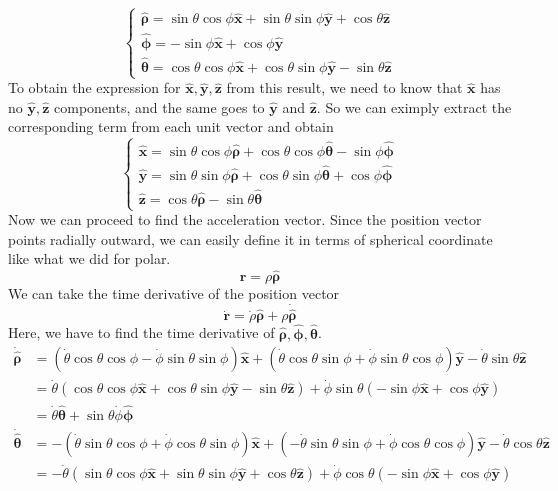 \documentclass[12pt]{article}
\newcommand{\paren}[1]{\left( #1 \right)}
\newcommand{\unx}{\hat{\mathbf{x}}}
\newcommand{\uny}{\hat{\mathbf{y}}}
\newcommand{\unz}{\hat{\mathbf{z}}}
\newcommand{\untheta}{\hat{\boldsymbol\theta}}
\newcommand{\unphi}{\hat{\boldsymbol\phi}}
\newcommand{\unrho}{\hat{\boldsymbol\rho}}
\begin{document}
\begin{enumerate}
\[\begin{cases}
        \unrho = \sin\theta\cos\phi \unx + \sin\theta\sin\phi\uny + \cos\theta \unz\\
        \unphi = -\sin\phi\unx + \cos\phi \uny\\
        \untheta = \cos\theta\cos\phi \unx + \cos\theta\sin\phi \uny - \sin\theta \unz
    \end{cases}
    \]
    To obtain the expression for $\unx, \uny, \unz$ from this result, we need to know that $\unx$ has no $\uny,\unz$ components, and the same goes to $\uny$ and $\unz$. So we can eximply extract the corresponding term from each unit vector and obtain
    \[
    \begin{cases}
        \unx = \sin\theta\cos\phi \unrho + \cos\theta\cos\phi \untheta -\sin\phi\unphi \\
        \uny = \sin\theta\sin\phi\unrho + \cos\theta\sin\phi\untheta +\cos\phi \unphi\\
        \unz =  \cos\theta\unrho - \sin\theta \untheta
    \end{cases}
    \]
    Now we can proceed to find the acceleration vector. Since the position vector points radially outward, we can easily define it in terms of spherical coordinate like what we did for polar. 
    \[
    \mathbf{r} = \rho\unrho
    \]
    We can take the time derivative of the position vector
    \[
    \dot{\mathbf{r}} = \dot{\rho}\unrho + \rho\dot{\unrho}
    \]
    Here, we have to find the time derivative of $\unrho,\unphi,\untheta$.
    \begin{align*}
        \dot{\unrho} &= \paren{\dot{\theta}\cos\theta\cos\phi -\dot{\phi}\sin\theta\sin\phi}\unx
                     + \paren{\dot{\theta}\cos\theta\sin\phi + \dot{\phi}\sin\theta\cos\phi}\uny
                     -\dot{\theta}\sin\theta \unz\\
                     &=\dot{\theta}\paren{\cos\theta\cos\phi \unx + \cos\theta\sin\phi \uny -\sin\theta\unz}+\dot{\phi}\sin\theta\paren{-\sin\phi \unx +\cos\phi \uny}\\
                     &= \dot{\theta}\untheta + \sin\theta\dot{\phi}\unphi
    \end{align*}
    \begin{align*}
        \dot{\untheta} &= -\paren{\dot{\theta}\sin\theta\cos\phi + \dot{\phi}\cos\theta\sin\phi}\unx + \paren{-\dot{\theta}\sin\theta\sin\phi + \dot{\phi}\cos\theta\cos\phi}\uny - \dot{\theta}\cos\theta\unz\\
                       &=-\dot{\theta}\paren{\sin\theta\cos\phi\unx + \sin\theta\sin\phi\uny +\cos\theta\unz} + \dot{\phi}\cos\theta\paren{-\sin\phi\unx + \cos\phi \uny}\\

\end{align*}
\end{enumerate}
\end{document}
